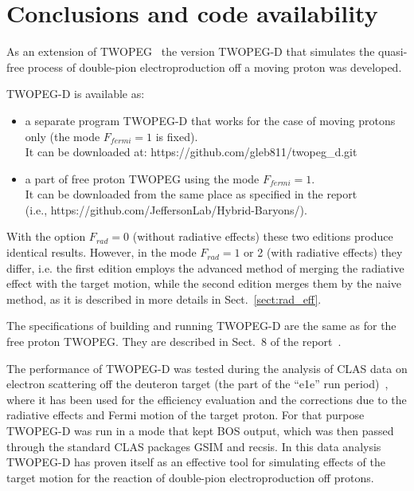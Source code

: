 \chapter{Conclusions and code availability}
\label{sect:concl}

As an extension of TWOPEG~\cite{twopeg} the version TWOPEG-D that simulates the quasi-free process of double-pion electroproduction off a moving proton was developed. 

TWOPEG-D is available as:

\begin{itemize}
\item a separate program TWOPEG-D that works for the case of moving protons only (the mode $F_{fermi}=1$ is fixed). 
\\It can be downloaded at: https://github.com/gleb811/twopeg\_d.git
\item a part of free proton TWOPEG using the mode $F_{fermi}=1$. 
\\It can be downloaded from the same place as specified in the report~\cite{twopeg} \\(i.e., https://github.com/JeffersonLab/Hybrid-Baryons/).
\end{itemize}


With the option $F_{rad}=0$ (without radiative effects) these two editions produce identical results. However, in the mode $F_{rad}=1$ or 2 (with radiative effects) they differ, i.e. the first edition employs the advanced method of merging the radiative effect with the target motion, while the second edition merges them by the naive method, as it is described in more details in Sect.~\ref{sect:rad_eff}.

The specifications of building and running TWOPEG-D are the same as for the free proton TWOPEG. They are described in Sect.~8 of the report~\cite{twopeg}. 

The performance of TWOPEG-D was tested during the analysis of CLAS data on electron scattering off the deuteron target (the part of the ``e1e'' run period)~\cite{Skorodum_wiki_page}, where it has been used for the efficiency evaluation and the corrections due to the radiative effects and Fermi motion of the target proton. For that purpose TWOPEG-D was run in a mode that kept BOS output, which was then passed through the standard CLAS packages GSIM and recsis. In this data analysis TWOPEG-D has proven itself as an effective tool for simulating effects of the target motion for the reaction of double-pion electroproduction off protons.


